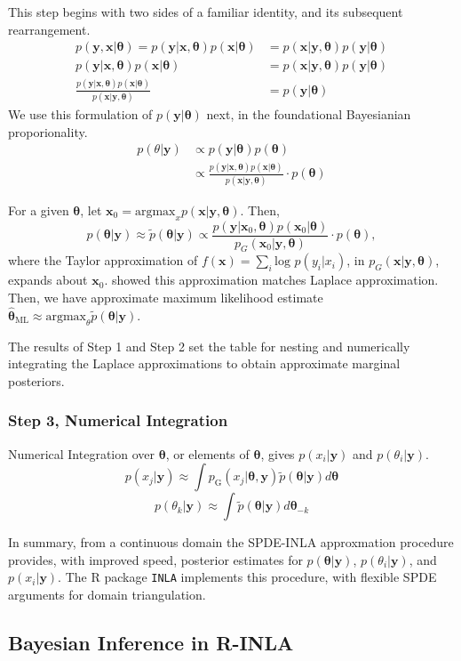 This step begins with two sides of a familiar identity, and its subsequent rearrangement.
\begin{align}
p(\pmb{y} , \pmb{x} | \pmb{\theta}) = p(\pmb{y} | \pmb{x}, \pmb{\theta}) p(\pmb{x} | \pmb{\theta})  &= p(\pmb{x} | \pmb{y}, \pmb{\theta}) p(\pmb{y} | \pmb{\theta}) \\
p(\pmb{y} | \pmb{x}, \pmb{\theta}) p(\pmb{x} | \pmb{\theta}) &= p(\pmb{x} | \pmb{y}, \pmb{\theta}) p(\pmb{y} | \pmb{\theta}) \\
\frac{p(\pmb{y} | \pmb{x}, \pmb{\theta}) p(\pmb{x} | \pmb{\theta})} {p(\pmb{x} | \pmb{y}, \pmb{\theta})} &= p(\pmb{y} | \pmb{\theta})  
\end{align}
We use this formulation of $p(\pmb{y} | \pmb{\theta})$ next, in the foundational Bayesianian proporionality.
\begin{align}
p(\theta|\pmb{y}) & \propto p(\pmb{y}|\pmb{\theta})p(\pmb{\theta}) \\
& \propto \frac{p(\pmb{y} | \pmb{x}, \pmb{\theta}) p(\pmb{x} | \pmb{\theta})}{p(\pmb{x} | \pmb{y}, \pmb{\theta})} \cdot p(\pmb{\theta})
\end{align}

For a given $\pmb{\theta}$, let $\pmb{x}_{0} = \text{argmax}_{x}p(\pmb{x}|\pmb{y},\pmb{\theta})$. Then,
$$ p(\pmb{\theta}|\pmb{y}) \approx \tilde{p}(\pmb{\theta}|\pmb{y}) \propto  \frac{p(\pmb{y} | \pmb{x}_{0}, \pmb{\theta}) p(\pmb{x}_{0} | \pmb{\theta})}{p_{G}(\pmb{x}_{0} | \pmb{y}, \pmb{\theta})} \cdot p(\pmb{\theta}),$$
where the Taylor approximation of $f(\pmb{x}) = \sum_{i} \text{log }p(y_{i}|x_{i})$, in $p_{G}(\pmb{x} | \pmb{y}, \pmb{\theta})$, expands about $\pmb{x}_{0}$. \cite{Tierney1986} showed this approximation matches Laplace approximation.  Then, we have approximate maximum likelihood estimate $\hat{\pmb{\theta}}_{\text{ML}} \approx \text{argmax}_{\theta} \tilde{p}(\pmb{\theta}|\pmb{y})$.

The results of Step 1 and Step 2 set the table for nesting and numerically integrating the Laplace approximations to obtain approximate marginal posteriors.

\subsubsection{Step 3, Numerical Integration} %
Numerical Integration over $\pmb{\theta}$, or elements of $\pmb{\theta}$, gives $p(x_{i}|\pmb{y})$ and $p(\theta_{i}|\pmb{y})$.
        $$ p(x_{j} | \pmb{y}) \approx \int p_{\text{G}}(x_{j}|\pmb{\theta, y})\tilde{p}(\pmb{\theta}|\pmb{y}) d\pmb{\theta} $$
        $$ p(\theta_{k} | \pmb{y}) \approx \int \tilde{p}(\pmb{\theta}|\pmb{y}) d\pmb{\theta}_{-k} $$

In summary, from a continuous domain the SPDE-INLA approxmation procedure provides, with improved speed, posterior estimates for $p(\pmb{\theta}|\pmb{y})$, $p(\theta_{i}|\pmb{y})$, and $p(x_{i}|\pmb{y})$. The R package \verb|INLA| implements this procedure, with flexible SPDE arguments for domain triangulation.

\subsection{Bayesian Inference in R-INLA}